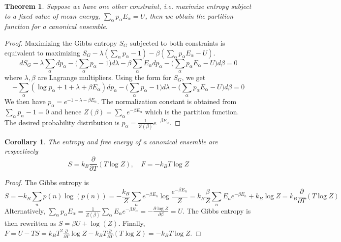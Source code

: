 \documentclass[a4paper]{article}
\theoremstyle{new}
\newtheorem{thm}{Theorem}[section]
\newtheorem{cor}{Corollary}[section]
\begin{document}
\begin{thm}
Suppose we have one other constraint, i.e. maximize entropy subject to a fixed value of mean energy, $\sum_\alpha p_\alpha E_\alpha=U$, then we obtain the partition function for a canonical ensemble.
\end{thm}
\begin{proof}
Maximizing the Gibbs entropy $S_G$ subjected to both constraints is equivalent to maximizing $S_G-\lambda(\sum_\alpha p_\alpha -1)-\beta(\sum_\alpha p_\alpha E_\alpha -U)$.
$$ dS_G-\lambda\sum_\alpha dp_\alpha-\bigg(\sum_\alpha p_\alpha-1\bigg)d\lambda-\beta\sum_\alpha E_\alpha dp_\alpha-\bigg(\sum_\alpha p_\alpha E_\alpha -U\bigg)d\beta=0$$
where $\lambda,\beta$ are Lagrange multipliers. Using the form for $S_G$, we get
$$-\sum_\alpha(\log p_\alpha+1+\lambda+\beta E_\alpha)dp_\alpha-\bigg(\sum_\alpha p_\alpha-1\bigg)d\lambda-\bigg(\sum_\alpha p_\alpha E_\alpha -U\bigg)d\beta=0$$
We then have $p_\alpha =e^{-1-\lambda-\beta E_\alpha}$. The normalization constant is obtained from $\sum_\alpha p_\alpha-1=0$ and hence $Z(\beta)=\sum_\alpha e^{-\beta E_\alpha}$ which is the partition function. The desired probability distribution is $p_\alpha=\frac{1}{Z(\beta)}e^{-\beta E_\alpha}$. 
\end{proof}
\begin{cor}
The entropy and free energy of a canonical ensemble are respectively
\begin{equation}
S=k_B\frac{\partial}{\partial T}(T\log Z),\quad F=-k_BT\log Z\label{canonical3}
\end{equation}
\end{cor}
\begin{proof}
The Gibbs entropy is
$$S=-k_B\sum_np(n)\log(p(n))=-\frac{k_B}{Z}\sum_ne^{-\beta E_n}\log\frac{e^{-\beta E_n}}{Z}=k_B\frac{\beta}{Z}\sum_nE_ne^{-\beta E_n}+k_B\log Z=k_B\frac{\partial}{\partial T}(T\log Z)$$
Alternatively, $\sum_\alpha p_\alpha E_\alpha=\frac{1}{Z(\beta)}\sum_\alpha E_\alpha e^{-\beta E_\alpha}=-\frac{\partial\log Z}{\partial\beta}=U$. The Gibbs entropy is then rewritten as $S=\beta U+\log(Z)$. Finally, $F=U-TS=k_BT^2\frac{\partial}{\partial T}\log Z-k_BT\frac{\partial}{\partial T}(T\log Z)=-k_BT\log Z$.
\end{proof}
\end{document}
